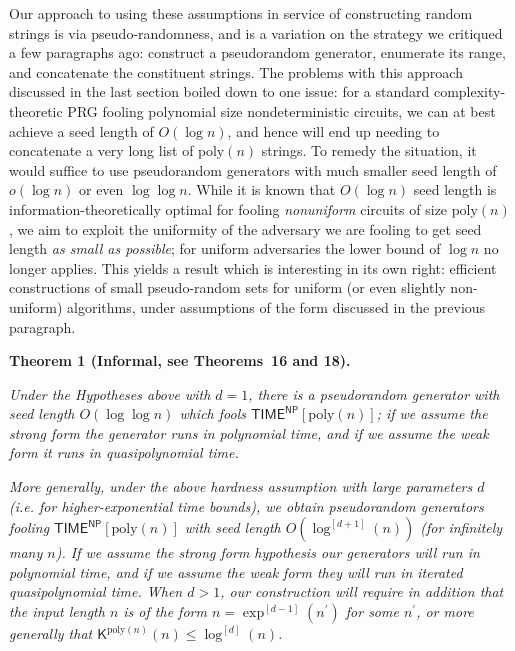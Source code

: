 \documentclass[10pt,a4paper]{article}
\begin{document}
Our approach to using these assumptions in service of constructing random strings is via pseudo-randomness, and is a variation on the strategy we critiqued a few paragraphs ago: construct a pseudorandom generator, enumerate its range, and concatenate the constituent strings. The problems with this approach discussed in the last section boiled down to one issue: for a standard complexity-theoretic PRG fooling polynomial size nondeterministic circuits, we can at best achieve a seed length of $O(\log n)$, and hence will end up needing to concatenate a very long list of $\mathrm{poly}(n)$ strings. To remedy the situation, it would suffice to use pseudorandom generators with much smaller seed length of $o(\log n)$ or even $\log\log n$. While it is known that $O(\log n)$ seed length is information-theoretically optimal for fooling \emph{nonuniform} circuits of size $\mathrm{poly}(n)$, we aim to exploit the uniformity of the adversary we are fooling to get seed length \emph{as small as possible}; for uniform adversaries the lower bound of $\log n$ no longer applies. This yields a result which is interesting in its own right: efficient constructions of small pseudo-random sets for uniform (or even slightly non-uniform) algorithms, under assumptions of the form discussed in the previous paragraph.\par





\par\medskip\noindent\textbf{
\textbf{Theorem 1}\textbf{ }(Informal, see Theorems 16 and 18)\textbf{.}
}\par



\emph{Under the Hypotheses above with $d=1$, there is a pseudorandom generator with seed length $O(\log\log n)$ which fools ${\mathsf{TIME}}^{{\mathsf{NP}}}[\mathrm{poly}(n)]$; if we assume the strong form the generator runs in polynomial time, and if we assume the weak form it runs in quasipolynomial time.}\par




\emph{More generally, under the above hardness assumption with large parameters $d$ (i.e. for higher-exponential time bounds), we obtain pseudorandom generators fooling ${\mathsf{TIME}}^{{\mathsf{NP}}}[\mathrm{poly}(n)]$ with seed length $O(\log^{[d+1]}(n))$ (for infinitely many $n$). If we assume the strong form hypothesis our generators will run in polynomial time, and if we assume the weak form they will run in iterated quasipolynomial time. When $d>1$, our construction will require in addition that the input length $n$ is of the form $n=\exp^{[d-1]}(n^{\prime})$ for some $n^{\prime}$, or more generally that ${\mathsf{K}}^{\mathrm{poly}(n)}(n)\leq\log^{[d]}(n)$.}\par
\end{document}

